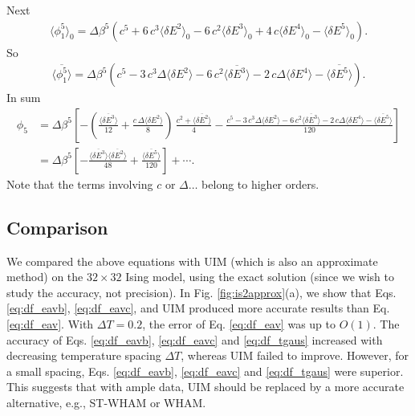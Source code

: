 \documentclass[aip,jcp,preprint,notitlepage, superscriptaddress]{revtex4-1}
\begin{document}
Next
\begin{align*}
\langle \phi_1^5 \rangle_0
=
\Delta \beta^5
\left(
c^5 + 6 \, c^3 \langle \delta E^2 \rangle_0
-6 \, c^2 \langle \delta E^3 \rangle_0
+4 \, c \langle \delta E^4 \rangle_0
-\langle \delta E^5 \rangle_0
\right).
\end{align*}
So
\begin{align*}
\overline{ \langle \phi_1^5 \rangle }
=
\Delta \beta^5
\left(
c^5
- 3 \, c^3 \Delta \langle \delta E^2 \rangle
-6 \, c^2 \overline{ \langle \delta E^3 \rangle }
-2 \, c \Delta \langle \delta E^4 \rangle
-\overline{ \langle \delta E^5 \rangle }
\right).
\end{align*}
In sum
\begin{align*}
\phi_5
&=
\Delta \beta^5
\left[
  -\left(
    \frac{ \overline{ \langle \delta E^3 \rangle } }
         { 12 }
    +
    \frac{ c \, \Delta \langle \delta E^2 \rangle }
         { 8 }
  \right)
\, \frac{ c^2 + \overline{ \langle \delta E^2 \rangle } }
        { 4 }
-\frac{
  c^5
  - 3 \, c^3 \Delta \langle \delta E^2 \rangle
  -6 \, c^2 \overline{ \langle \delta E^3 \rangle }
  -2 \, c \Delta \langle \delta E^4 \rangle
  -\overline{ \langle \delta E^5 \rangle }
} { 120 }
\right] \\
&=
\Delta \beta^5
\left[
  -\frac{ \overline{ \langle \delta E^3 \rangle }
          \overline{ \langle \delta E^2 \rangle } }
        { 48 }
+\frac{
  \overline{ \langle \delta E^5 \rangle }
} { 120 }
\right] + \cdots.
\end{align*}
%
Note that the terms involving $c$ or $\Delta \dots$
belong to higher orders.



\subsection{Comparison}


We compared the above equations
with UIM\cite{kastner2005, *kastner2009}
(which is also an approximate method)
on the $32\times 32$ Ising model,
%
using the exact solution\cite{
ferdinand1969}
(since we wish to study
the accuracy, not precision).
%
In Fig. \ref{fig:is2approx}(a),
we show that
Eqs. \eqref{eq:df_eavb},
\eqref{eq:df_eavc},
and UIM
produced more accurate results than
Eq. \eqref{eq:df_eav}.
%
With $\Delta T = 0.2$,
the error of Eq. \eqref{eq:df_eav}
was up to $O(1)$.
%
The accuracy of
Eqs. \eqref{eq:df_eavb}, \eqref{eq:df_eavc} and \eqref{eq:df_tgaus}
increased with decreasing temperature spacing $\Delta T$,
whereas
UIM failed to improve.
%
However, for a small spacing,
Eqs. \eqref{eq:df_eavb}, \eqref{eq:df_eavc} and \eqref{eq:df_tgaus}
were superior.
%
This suggests that with ample data,
UIM should be replaced
by a more accurate alternative, e.g., ST-WHAM or WHAM.
\end{document}
